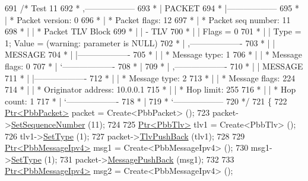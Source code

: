 \begin{DoxyCode}
691   \textcolor{comment}{/* Test 11}
692 \textcolor{comment}{         * ,------------------}
693 \textcolor{comment}{         * |  PACKET}
694 \textcolor{comment}{         * |------------------}
695 \textcolor{comment}{         * | * Packet version:    0}
696 \textcolor{comment}{         * | * Packet flags:  12}
697 \textcolor{comment}{         * | * Packet seq number: 11}
698 \textcolor{comment}{         * |    | * Packet TLV Block}
699 \textcolor{comment}{         * |    |     - TLV}
700 \textcolor{comment}{         * |    |         Flags = 0}
701 \textcolor{comment}{         * |    |         Type = 1; Value = (warning: parameter is NULL)}
702 \textcolor{comment}{         * |    ,-------------------}
703 \textcolor{comment}{         * |    |  MESSAGE}
704 \textcolor{comment}{         * |    |-------------------}
705 \textcolor{comment}{         * |    | * Message type:       1}
706 \textcolor{comment}{         * |    | * Message flags:  0}
707 \textcolor{comment}{         * |    `-------------------}
708 \textcolor{comment}{         * |}
709 \textcolor{comment}{         * |    ,-------------------}
710 \textcolor{comment}{         * |    |  MESSAGE}
711 \textcolor{comment}{         * |    |-------------------}
712 \textcolor{comment}{         * |    | * Message type:       2}
713 \textcolor{comment}{         * |    | * Message flags:  224}
714 \textcolor{comment}{         * |    | * Originator address: 10.0.0.1}
715 \textcolor{comment}{         * |    | * Hop limit:          255}
716 \textcolor{comment}{         * |    | * Hop count:          1}
717 \textcolor{comment}{         * |    `-------------------}
718 \textcolor{comment}{         * |}
719 \textcolor{comment}{         * `------------------}
720 \textcolor{comment}{   */}
721   \{
722     \hyperlink{classns3_1_1Ptr}{Ptr<PbbPacket>} packet = Create<PbbPacket> ();
723     packet->\hyperlink{classns3_1_1PbbPacket_a7d6a1602be86109760d0f26ff9bbbb8e}{SetSequenceNumber} (11);
724 
725     \hyperlink{classns3_1_1Ptr}{Ptr<PbbTlv>} tlv1 = Create<PbbTlv> ();
726     tlv1->\hyperlink{classns3_1_1PbbTlv_a90a0452018ed364ac37c3ad116dd718b}{SetType} (1);
727     packet->\hyperlink{classns3_1_1PbbPacket_a34935793e729a106c176db99c969cb42}{TlvPushBack} (tlv1);
728 
729     \hyperlink{classns3_1_1Ptr}{Ptr<PbbMessageIpv4>} msg1 = Create<PbbMessageIpv4> ();
730     msg1->\hyperlink{classns3_1_1PbbMessage_a4b3d1eaabd3e7412a46ac79bf3360dac}{SetType} (1);
731     packet->\hyperlink{classns3_1_1PbbPacket_a4a3170001ef758d9c9c4375b8f089826}{MessagePushBack} (msg1);
732 
733     \hyperlink{classns3_1_1Ptr}{Ptr<PbbMessageIpv4>} msg2 = Create<PbbMessageIpv4> ();

\end{DoxyCode}
